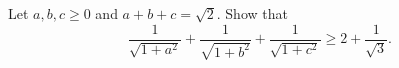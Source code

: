 Let $a,b,c\ge 0$ and $a+b+c=\sqrt2$. Show that
\[\frac1{\sqrt{1+a^2}}+\frac1{\sqrt{1+b^2}}+\frac1{\sqrt{1+c^2}} \ge 2+\frac1{\sqrt3}.\]
